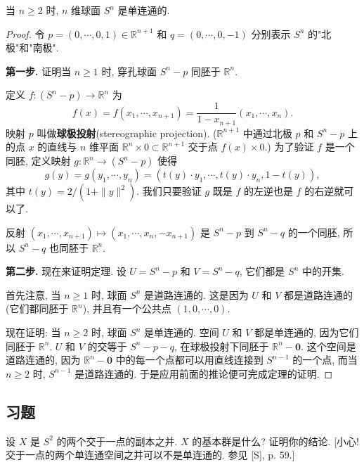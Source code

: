 \begin{theorem}
\label{theorem:ch09-sec59-59-3}
当 $n\geqslant 2$ 时, $n$ 维球面 $S^{n}$ 是单连通的.
\end{theorem}

\begin{proof}
令 $p=(0,\cdots,0,1)\in\mathbb{R}^{n+1}$ 和 $q=(0,\cdots,0,-1)$ 分别表示 $S^{n}$ 的"北极"和"南极".

\textbf{第一步.} 证明当 $n\geqslant 1$ 时, 穿孔球面 $S^{n}-p$ 同胚于 $\mathbb{R}^{n}$.

定义 $f\colon(S^{n}-p)\to\mathbb{R}^{n}$ 为
\[
f(x)=f(x_{1},\cdots,x_{n+1})=\frac{1}{1-x_{n+1}}(x_{1},\cdots,x_{n}).
\]
映射 $p$ 叫做\textbf{球极投射}(stereographic projection). ($\mathbb{R}^{n+1}$ 中通过北极 $p$ 和 $S^{n}-p$ 上的点 $x$ 的直线与 $n$ 维平面 $\mathbb{R}^{n}\times 0\subset\mathbb{R}^{n+1}$ 交于点 $f(x)\times 0$.) 为了验证 $f$ 是一个同胚, 定义映射 $g\colon\mathbb{R}^{n}\to(S^{n}-p)$ 使得
\[
g(y)=g(y_{1},\cdots,y_{n})=(t(y)\cdot y_{1},\cdots,t(y)\cdot y_{n},1-t(y)),
\]
其中 $t(y)=2/(1+\|y\|^{2})$. 我们只要验证 $g$ 既是 $f$ 的左逆也是 $f$ 的右逆就可以了.

反射 $(x_1,\cdots,x_{n+1})\mapsto(x_1,\cdots,x_n,-x_{n+1})$ 是 $S^{n}-p$ 到 $S^{n}-q$ 的一个同胚, 所以 $S^{n}-q$ 也同胚于 $\mathbb{R}^{n}$.

\textbf{第二步.} 现在来证明定理. 设 $U=S^{n}-p$ 和 $V=S^{n}-q$, 它们都是 $S^{n}$ 中的开集.

首先注意, 当 $n\geqslant 1$ 时, 球面 $S^{n}$ 是道路连通的. 这是因为 $U$ 和 $V$ 都是道路连通的 (它们都同胚于 $\mathbb{R}^{n}$), 并且有一个公共点 $(1,0,\cdots,0)$.

现在证明: 当 $n\geqslant 2$ 时, 球面 $S^{n}$ 是单连通的. 空间 $U$ 和 $V$ 都是单连通的, 因为它们同胚于 $\mathbb{R}^{n}$. $U$ 和 $V$ 的交等于 $S^{n}-p-q$, 在球极投射下同胚于 $\mathbb{R}^{n}-\boldsymbol{0}$. 这个空间是道路连通的, 因为 $\mathbb{R}^{n}-\boldsymbol{0}$ 中的每一个点都可以用直线连接到 $S^{n-1}$ 的一个点, 而当 $n\geqslant 2$ 时, $S^{n-1}$ 是道路连通的. 于是应用前面的推论便可完成定理的证明.
\end{proof}

\subsection*{习题}

\begin{exercise}
设 $X$ 是 $S^{2}$ 的两个交于一点的副本之并. $X$ 的基本群是什么? 证明你的结论. [小心! 交于一点的两个单连通空间之并可以不是单连通的. 参见 [S], p. 59.]
\end{exercise}

